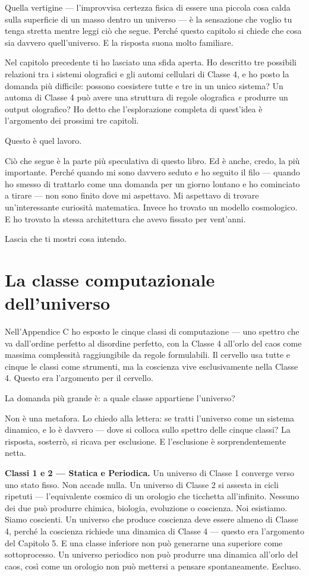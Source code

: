 \documentclass[11pt, twoside, openright]{book}
\begin{document}
Quella vertigine --- l'improvvisa certezza fisica di essere una piccola cosa calda sulla superficie di un masso dentro un universo --- è la sensazione che voglio tu tenga stretta mentre leggi ciò che segue. Perché questo capitolo si chiede che cosa sia davvero quell'universo. E la risposta suona molto familiare.


Nel capitolo precedente ti ho lasciato una sfida aperta. Ho descritto tre possibili relazioni tra i sistemi olografici e gli automi cellulari di Classe 4, e ho posto la domanda più difficile: possono coesistere tutte e tre in un unico sistema? Un automa di Classe 4 può avere una struttura di regole olografica \textit{e} produrre un output olografico? Ho detto che l'esplorazione completa di quest'idea è l'argomento dei prossimi tre capitoli.

Questo è quel lavoro.

Ciò che segue è la parte più speculativa di questo libro. Ed è anche, credo, la più importante. Perché quando mi sono davvero seduto e ho seguito il filo --- quando ho smesso di trattarlo come una domanda per un giorno lontano e ho cominciato a tirare --- non sono finito dove mi aspettavo. Mi aspettavo di trovare un'interessante curiosità matematica. Invece ho trovato un modello cosmologico. E ho trovato la stessa architettura che avevo fissato per vent'anni.

Lascia che ti mostri cosa intendo.


\section*{La classe computazionale dell'universo}

Nell'Appendice C ho esposto le cinque classi di computazione --- uno spettro che va dall'ordine perfetto al disordine perfetto, con la Classe 4 all'orlo del caos come massima complessità raggiungibile da regole formulabili. Il cervello usa tutte e cinque le classi come strumenti, ma la coscienza vive esclusivamente nella Classe 4. Questo era l'argomento per il cervello.

La domanda più grande è: a quale classe appartiene l'universo?

Non è una metafora. Lo chiedo alla lettera: se tratti l'universo come un sistema dinamico, e lo è davvero --- dove si colloca sullo spettro delle cinque classi? La risposta, sosterrò, si ricava per esclusione. E l'esclusione è sorprendentemente netta.

\textbf{Classi 1 e 2 --- Statica e Periodica.} Un universo di Classe 1 converge verso uno stato fisso. Non accade nulla. Un universo di Classe 2 si assesta in cicli ripetuti --- l'equivalente cosmico di un orologio che ticchetta all'infinito. Nessuno dei due può produrre chimica, biologia, evoluzione o coscienza. Noi esistiamo. Siamo coscienti. Un universo che produce coscienza deve essere almeno di Classe 4, perché la coscienza richiede una dinamica di Classe 4 --- questo era l'argomento del Capitolo 5. E una classe inferiore non può generarne una superiore come sottoprocesso. Un universo periodico non può produrre una dinamica all'orlo del caos, così come un orologio non può mettersi a pensare spontaneamente. Escluso.
\end{document}

